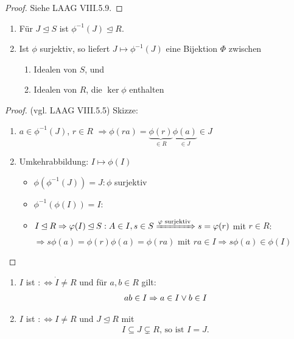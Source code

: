\begin{proof}
	Siehe LAAG VIII.5.9.
\end{proof}

\begin{lemma}
	\begin{enumerate}
		\item Für $J \unlhd S$ ist $\phi^{-1}(J) \unlhd R$.
		\item Ist $\phi$ surjektiv, so liefert $J \mapsto \phi^{-1}(J)$ eine Bijektion $\Phi$ zwischen
		\begin{enumerate}
			\item Idealen von $S$, und
			\item Idealen von $R$, die $\ker \phi$ enthalten
		\end{enumerate}
	\end{enumerate}
\end{lemma}

\begin{proof}
	(vgl. LAAG VIII.5.5)
	Skizze:
	\begin{enumerate}
		\item $a \in \phi^{-1}(J)$, $r \in R$ $\Rightarrow \phi(ra) = \underbrace{\phi(r)}_{\in R}\underbrace{\phi(a)}_{\in J}\in J$
		\item Umkehrabbildung: $I \mapsto \phi(I)$
		\begin{itemize}
			\item $\phi(\phi^{-1}(J))=J\colon \phi$ surjektiv
			\item $\phi^{-1}(\phi(I)) = I\colon$ 
			\item $I \unlhd R \Rightarrow \phi(I) \unlhd S: A \in I, s \in S \xRightarrow{\phi \text{ surjektiv}} s = \phi(r)$ mit $r \in R$:\\
			$\Rightarrow s \phi(a) = \phi(r)\phi(a) = \phi(ra)$ mit $ra \in I \Rightarrow s\phi(a) \in \phi(I)$
		\end{itemize}
	\end{enumerate}
\end{proof}

\begin{definition}
	\begin{enumerate}
		\item $I$ ist  $:\Leftrightarrow \dot{I} \neq R$ und für $a,b \in R$ gilt:
		\begin{align}
			ab \in I \Rightarrow a \in I \vee b \in I\notag
		\end{align}
		\item $I$ ist  $:\Leftrightarrow I \neq R$ und $J \unlhd R$ mit
		\begin{align}
			I \subseteq J \subsetneq R\text{, so ist } I = J.
		\end{align}
	\end{enumerate}
\end{definition}

